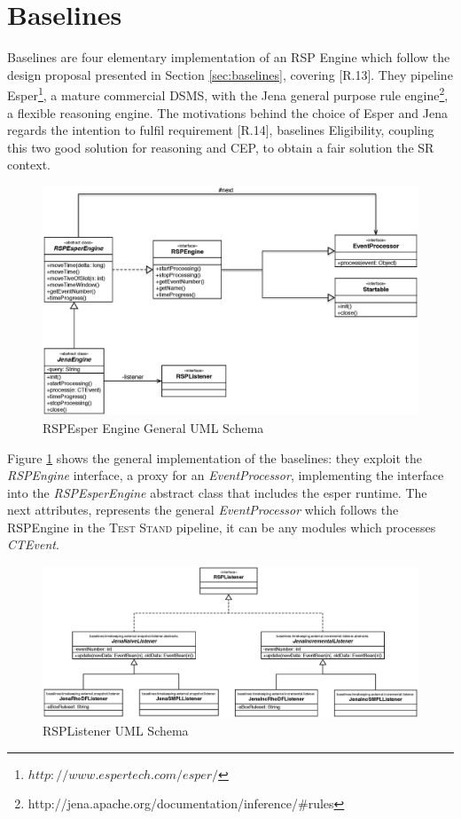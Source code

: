 \section{Baselines}\label{sec:baselines-impl}

\name Baselines are four elementary implementation of an RSP Engine which follow the design proposal presented in Section \ref{sec:baselines}, covering [R.13]. They pipeline Esper\footnote{$http://www.espertech.com/esper/$}, a mature commercial DSMS, with the Jena general purpose rule engine\footnote{http://jena.apache.org/documentation/inference/\#rules
}, a flexible reasoning engine. The motivations behind the choice of Esper and Jena regards the intention to fulfil requirement [R.14], baselines Eligibility, coupling this two good solution for reasoning and CEP, to obtain a fair solution the SR context. 

\begin{figure}[tbh]
  \centering
	\includegraphics[width=\linewidth]{images/uml_baselines_general}
	\caption{RSPEsper Engine General UML Schema} 
  	\label{fig:uml_baselines_general}
\end{figure}

Figure \ref{fig:uml_baselines_general} shows the general implementation of the baselines: they  exploit the \textit{RSPEngine} interface, a proxy for an \textit{EventProcessor}, implementing the interface into the \textit{RSPEsperEngine} abstract class that includes the esper runtime. The next attributes, represents the general \textit{EventProcessor} which follows the RSPEngine in the \textsc{Test Stand} pipeline, it can be any modules which processes \textit{CTEvent}.

\begin{figure}[tbh]
  \centering
	\includegraphics[width=\linewidth]{images/uml_baselines_listener}
	\caption{RSPListener UML Schema} 
  	\label{fig:uml_baselines_listener}
\end{figure}

